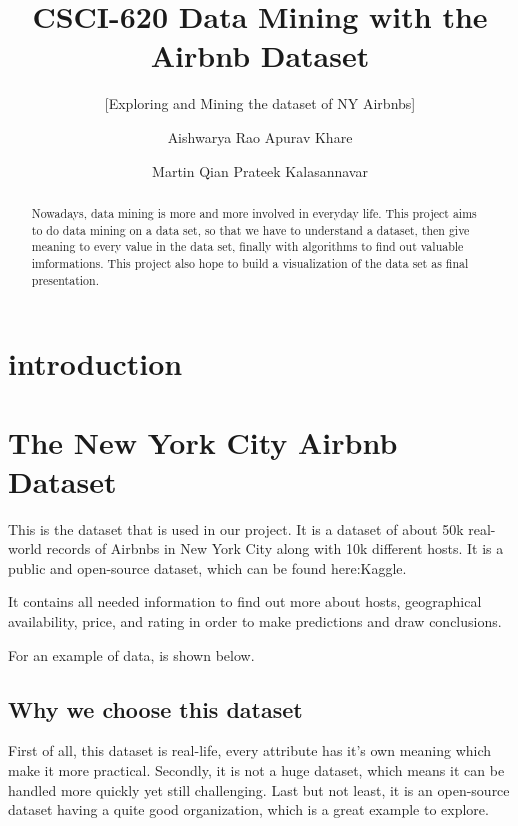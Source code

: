 \documentclass{sig-alternate}
\begin{document}
\title{CSCI-620 Data Mining with the Airbnb Dataset}
\subtitle{[Exploring and Mining the dataset of NY Airbnbs]}

\author
{
\alignauthor
  Aishwarya Rao
\alignauthor
  Apurav Khare
\and
\alignauthor
  Martin Qian
\alignauthor
  Prateek Kalasannavar
}

\maketitle
\begin{abstract}

Nowadays, data mining is more and more involved in everyday life. This project
aims to do data mining on a data set, so that we have to understand a dataset, then 
give meaning to every value in the data set, finally with algorithms to find out valuable imformations. 
This project also hope to build a visualization of the data set as final presentation.

\end{abstract}

\section{introduction}

\section{The New York City Airbnb Dataset}
This is the dataset that is used in our project. It is a dataset 
of about 50k real-world records of Airbnbs in New York City along with 10k different hosts. 
It is a public and open-source dataset, which can be found here:Kaggle{}.

It contains all needed information to find out more about hosts, geographical availability, 
price, and rating in order to make predictions and draw conclusions.

For an example of data, is shown below. 

\subsection{Why we choose this dataset}
First of all, this dataset is real-life, every attribute has it's own meaning which make it more practical. 
Secondly, it is not a huge dataset, which means it can be handled more quickly yet still challenging. 
Last but not least, it is an open-source dataset having a quite good organization, which is a great example to explore.
\end{document}
